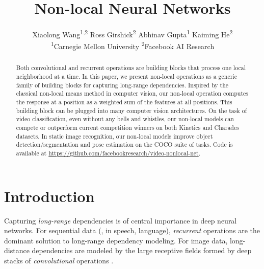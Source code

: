 \documentclass[10pt,twocolumn,letterpaper]{article}
\begin{document}
\title{Non-local Neural Networks \vspace{-.5em}}

\author{
Xiaolong Wang\textsuperscript{1,2}\footnotemark \qquad
Ross Girshick\textsuperscript{2} \qquad
Abhinav Gupta\textsuperscript{1} \qquad
Kaiming He\textsuperscript{2} \vspace{.3em}\\
\textsuperscript{1}Carnegie Mellon University \qquad\qquad \textsuperscript{2}Facebook AI Research
\vspace{-.6em}
}

\maketitle
\renewcommand*{\thefootnote}{\fnsymbol{footnote}}
\setcounter{footnote}{1}
\renewcommand*{\thefootnote}{\arabic{footnote}}
\setcounter{footnote}{0}



\begin{abstract}
\vspace{-.5em}
Both convolutional and recurrent operations are building blocks that process one local neighborhood at a time. In this paper, we present non-local operations as a generic family of building blocks for capturing long-range dependencies. Inspired by the classical non-local means method \cite{Buades2005} in computer vision, our non-local operation computes the response at a position as a weighted sum of the features at all positions. This building block can be plugged into many computer vision architectures. On the task of video classification, even without any bells and whistles, our non-local models can compete or outperform current competition winners on both Kinetics and Charades datasets.
In static image recognition, our non-local models improve object detection/segmentation and pose estimation on the COCO suite of tasks. Code is available at \url{https://github.com/facebookresearch/video-nonlocal-net}.
\end{abstract}
\vspace{-1em}
\section{Introduction}

Capturing \emph{long-range} dependencies is of central importance in deep neural networks. For sequential data (\eg, in speech, language), \emph{recurrent} operations \cite{Rumelhart1986,Hochreiter1997} are the dominant solution to long-range dependency modeling. For image data, long-distance dependencies are modeled by the large receptive fields formed by deep stacks of \emph{convolutional} operations \cite{Fukushima1982,LeCun1989}.
\end{document}
